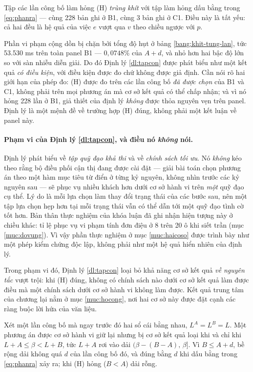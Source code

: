 Tập các lần công bố làm hỏng (H) \emph{trùng khít} với tập làm hỏng dấu bằng trong
\eqref{eq:phanra} --- cùng 228 bản ghi ở B1, cùng 3 bản ghi ở C1. Điều này là tất yếu: cả hai
đều là hệ quả của việc $e$ vượt qua $v$ theo chiều ngược với $p$.

Phần vi phạm cộng dồn bị chặn bởi tổng độ hụt ở bảng \ref{bang:khit-tung-lan}, tức 53.530 ms
trên toàn panel B1 --- $0{,}0748\%$ của $A+d$, và nhỏ hơn hai bậc độ lớn so với sàn nhiễu diễn
giải. Do đó Định lý \ref{dl:tapcon} được phát biểu như một kết quả \emph{có điều kiện}, với điều
kiện được đo chứ không được giả định. Cần nói rõ hai giới hạn của phép đo: (H) được đo trên các lần
công bố \emph{đã được chọn} của B1 và C1, không phải trên mọi phương án mà cơ sở kết quả có thể chấp
nhận; và vì nó hỏng 228 lần ở B1, giả thiết của định lý \emph{không} được thỏa nguyên vẹn trên
panel. Định lý là một mệnh đề về trường hợp (H) đúng, không phải một kết luận về panel này.

\paragraph{Phạm vi của Định lý \ref{dl:tapcon}, và điều nó \emph{không} nói.} Định lý phát biểu
về \emph{tập quỹ đạo khả thi} và về \emph{chính sách tối ưu}. Nó \emph{không} kéo theo rằng bộ
điều phối cận thị đang được cài đặt --- giải bài toán chọn phương án theo một hàm mục tiêu từ điển
ở từng kỷ nguyên, không nhìn trước các kỷ nguyên sau ---
sẽ phục vụ nhiều khách hơn dưới cơ sở hành vi trên \emph{một} quỹ đạo cụ thể. Lý do là mỗi lựa
chọn làm thay đổi trạng thái của các bước sau, nên một tập lựa chọn hẹp hơn tại mỗi trạng thái
vẫn có thể dẫn tới một quỹ đạo tình cờ tốt hơn. Bản thân thực nghiệm của khóa luận đã ghi nhận
hiện tượng này ở chiều khác: tỉ lệ phục vụ vi phạm tính đơn điệu ở 8 trên 20 ô khi siết trần
(mục \ref{muc:dovung}). Vì vậy phần thực nghiệm ở mục \ref{muc:haicoso} được trình bày như một
phép kiểm chứng độc lập, không phải như một hệ quả hiển nhiên của định lý.

Trong phạm vi đó, Định lý \ref{dl:tapcon} loại bỏ khả năng cơ sở kết quả \emph{về nguyên tắc}
vượt trội: khi (H) đúng, không có chính sách nào dưới cơ sở kết quả làm được điều mà một chính
sách dưới cơ sở hành vi không làm được. Kết quả trung tâm của chương lại nằm ở mục
\ref{muc:hocong}, nơi hai cơ sở này được đặt cạnh các ràng buộc lời hứa của văn liệu.

\begin{hequa}
\label{hq:dai}
Xét một lần công bố mà ngay trước đó hai sổ cái bằng nhau, $L^{A} = L^{B} = L$. Một phương án được
cơ sở hành vi giữ lại nhưng bị cơ sở kết quả loại khi và chỉ khi $L + A \le \beta < L + B$, tức
$L + A$ rơi vào dải $(\beta - (B - A),\, \beta]$. Vì $B \le A + d$, bề rộng dải không quá $d$ của
lần công bố đó, và đúng bằng $d$ khi dấu bằng trong \eqref{eq:phanra} xảy ra; khi (H) hỏng
($B < A$) dải rỗng.
\end{hequa}

